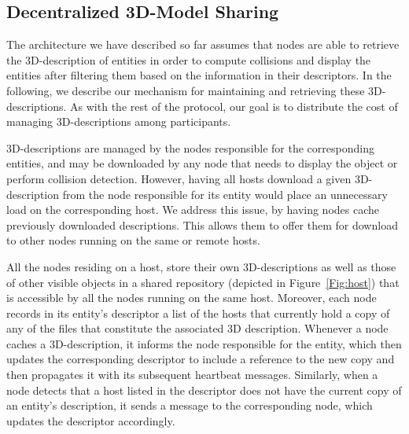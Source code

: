 \subsection{Decentralized 3D-Model Sharing}
\label{sec:decentr-3d-models}
The architecture we have described so far assumes that nodes are able
to retrieve the 3D-description of entities in order to compute
collisions and display the entities after filtering them based on the
information in their descriptors. In the following, we describe our
mechanism for maintaining and retrieving these 3D-descriptions. As
with the rest of the protocol, our goal is to distribute the cost of
managing 3D-descriptions among \sol participants.



3D-descriptions are managed by the nodes responsible for the
corresponding entities, and may be downloaded by any node that needs
to display the object or perform collision detection. However, having
all hosts download a given 3D-description from the node responsible
for its entity would place an unnecessary load on the corresponding
host. We address this issue, by having \sol nodes cache previously
downloaded descriptions. This allows them to offer them for download
to other \sol nodes running on the same or remote hosts.

All the nodes residing on a host, store their own 3D-descriptions as
well as those of other visible objects in a shared repository
(depicted in Figure~\ref{Fig:host}) that is accessible by all the nodes
running on the same host. Moreover, each node records in its
entity's descriptor a list of the hosts that currently hold a copy of
any of the files that constitute the associated 3D description.
Whenever a node caches a 3D-description, it informs the node
responsible for the entity, which then updates the corresponding
descriptor to include a reference to the new copy and then propagates
it with its subsequent heartbeat messages. Similarly, when a
node detects that a host listed in the descriptor does not have the
current copy of an entity's description, it sends a message to the
corresponding node, which updates the descriptor accordingly.

